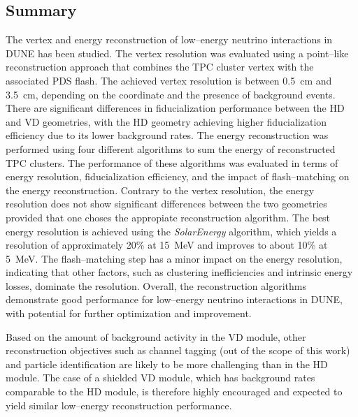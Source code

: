 \subsection{Summary}
The vertex and energy reconstruction of low--energy neutrino interactions in DUNE has been studied. The vertex resolution was evaluated using a point--like reconstruction approach that combines the TPC cluster vertex with the associated PDS flash. The achieved vertex resolution is between \SI{0.5}{\centi\meter} and \SI{3.5}{\centi\meter}, depending on the coordinate and the presence of background events. There are significant differences in fiducialization performance between the \ac{HD} and \ac{VD} geometries, with the \ac{HD} geometry achieving higher fiducialization efficiency due to its lower background rates. The energy reconstruction was performed using four different algorithms to sum the energy of reconstructed \ac{TPC} clusters. The performance of these algorithms was evaluated in terms of energy resolution, fiducialization efficiency, and the impact of flash--matching on the energy reconstruction. Contrary to the vertex resolution, the energy resolution does not show significant differences between the two geometries provided that one choses the appropiate reconstruction algorithm. The best energy resolution is achieved using the \textit{SolarEnergy} algorithm, which yields a resolution of approximately \num{20}\% at \SI{15}{\mega\electronvolt} and improves to about \num{10}\% at \SI{5}{\mega\electronvolt}. The flash--matching step has a minor impact on the energy resolution, indicating that other factors, such as clustering inefficiencies and intrinsic energy losses, dominate the resolution. Overall, the reconstruction algorithms demonstrate good performance for low--energy neutrino interactions in DUNE, with potential for further optimization and improvement.

Based on the amount of background activity in the \ac{VD} module, other reconstruction objectives such as channel tagging (out of the scope of this work) and particle identification are likely to be more challenging than in the \ac{HD} module. The case of a shielded \ac{VD} module, which has background rates comparable to the \ac{HD} module, is therefore highly encouraged and expected to yield similar low--energy reconstruction performance.